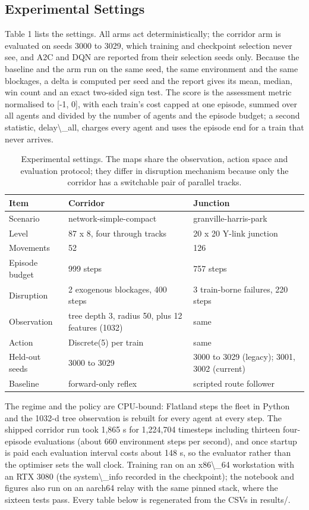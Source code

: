 \documentclass[11pt,a4paper]{article}
\begin{document}
\subsection{Experimental Settings}

Table 1 lists the settings. All arms act deterministically; the corridor arm is evaluated on seeds 3000 to 3029, which training and checkpoint selection never see, and A2C and DQN are reported from their selection seeds only. Because the baseline and the arm run on the same seed, the same environment and the same blockages, a delta is computed per seed and the report gives its mean, median, win count and an exact two-sided sign test. The score is the assessment metric normalised to [-1, 0], with each train's cost capped at one episode, summed over all agents and divided by the number of agents and the episode budget; a second statistic, delay\textbackslash{}\_all, charges every agent and uses the episode end for a train that never arrives.
\begin{table}[htbp]
\centering
\footnotesize
\begin{tabular}{@{}p{3.2cm}p{5.6cm}p{5.6cm}@{}}
\toprule
\textbf{Item} & \textbf{Corridor} & \textbf{Junction} \\
\midrule
Scenario & network-simple-compact & granville-harris-park \\
Level & 87 x 8, four through tracks & 20 x 20 Y-link junction \\
Movements & 52 & 126 \\
Episode budget & 999 steps & 757 steps \\
Disruption & 2 exogenous blockages, 400 steps & 3 train-borne failures, 220 steps \\
Observation & tree depth 3, radius 50, plus 12 features (1032) & same \\
Action & Discrete(5) per train & same \\
Held-out seeds & 3000 to 3029 & 3000 to 3029 (legacy); 3001, 3002 (current) \\
Baseline & forward-only reflex & scripted route follower \\
\bottomrule
\end{tabular}
\caption{Experimental settings. The maps share the observation, action space and evaluation protocol; they differ in disruption mechanism because only the corridor has a switchable pair of parallel tracks.}
\end{table}
The regime and the policy are CPU-bound: Flatland steps the fleet in Python and the 1032-d tree observation is rebuilt for every agent at every step. The shipped corridor run took 1,865 s for 1,224,704 timesteps including thirteen four-episode evaluations (about 660 environment steps per second), and once startup is paid each evaluation interval costs about 148 s, so the evaluator rather than the optimiser sets the wall clock. Training ran on an x86\textbackslash{}\_64 workstation with an RTX 3080 (the system\textbackslash{}\_info recorded in the checkpoint); the notebook and figures also run on an aarch64 relay with the same pinned stack, where the sixteen tests pass. Every table below is regenerated from the CSVs in results/.
\end{document}
